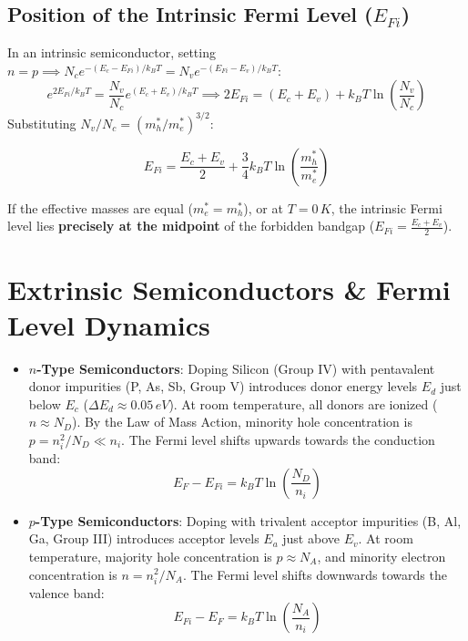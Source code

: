 \subsection{Position of the Intrinsic Fermi Level (\texorpdfstring{$E_{Fi}$}{EFi})}
In an intrinsic semiconductor, setting $n = p \implies N_c e^{-(E_c - E_{Fi})/k_B T} = N_v e^{-(E_{Fi} - E_v)/k_B T}$:
\begin{equation}
    e^{2E_{Fi}/k_B T} = \frac{N_v}{N_c} e^{(E_c + E_v)/k_B T} \implies 2E_{Fi} = (E_c + E_v) + k_B T \ln\left(\frac{N_v}{N_c}\right)
\end{equation}
Substituting $N_v / N_c = (m_h^* / m_e^*)^{3/2}$:

\begin{keyequation}
\begin{equation}
    E_{Fi} = \frac{E_c + E_v}{2} + \frac{3}{4} k_B T \ln\left( \frac{m_h^*}{m_e^*} \right)
\end{equation}
\end{keyequation}
If the effective masses are equal ($m_e^* = m_h^*$), or at $T = 0\,\si{K}$, the intrinsic Fermi level lies \textbf{precisely at the midpoint} of the forbidden bandgap ($E_{Fi} = \frac{E_c + E_v}{2}$).

\section{Extrinsic Semiconductors \& Fermi Level Dynamics}

\begin{itemize}
    \item \textbf{$n$-Type Semiconductors}: Doping Silicon (Group IV) with pentavalent donor impurities (P, As, Sb, Group V) introduces donor energy levels $E_d$ just below $E_c$ ($\Delta E_d \approx 0.05\,\si{eV}$). At room temperature, all donors are ionized ($n \approx N_D$). By the Law of Mass Action, minority hole concentration is $p = n_i^2 / N_D \ll n_i$. The Fermi level shifts upwards towards the conduction band:
    \begin{equation}
        E_F - E_{Fi} = k_B T \ln\left(\frac{N_D}{n_i}\right)
    \end{equation}
    \item \textbf{$p$-Type Semiconductors}: Doping with trivalent acceptor impurities (B, Al, Ga, Group III) introduces acceptor levels $E_a$ just above $E_v$. At room temperature, majority hole concentration is $p \approx N_A$, and minority electron concentration is $n = n_i^2 / N_A$. The Fermi level shifts downwards towards the valence band:
    \begin{equation}
        E_{Fi} - E_F = k_B T \ln\left(\frac{N_A}{n_i}\right)
    \end{equation}
\end{itemize}

